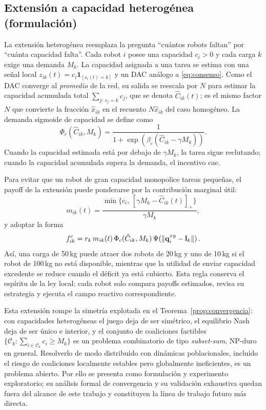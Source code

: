 \subsection{Extensión a capacidad heterogénea (formulación)}
\label{subsec:heterogenea}

La extensión heterogénea reemplaza la pregunta ``cuántos robots faltan'' por ``cuánta
capacidad falta''. Cada robot $i$ posee una capacidad $c_i>0$ y cada carga $k$ exige una
demanda $M_k$. La capacidad asignada a una tarea se estima con una señal local
$z_{ik}(t)=c_i\mathbf{1}_{[s_i(t)=k]}$ y un DAC análogo a \eqref{eq:consenso}. Como el
DAC converge al \emph{promedio} de la red, su salida se reescala por $N$ para estimar la
capacidad acumulada total $\sum_{j:\,s_j=k} c_j$, que se denota $\hat{C}_{ik}(t)$; es el
mismo factor $N$ que convierte la fracción $\hat{x}_{ik}$ en el recuento $N\hat{x}_{ik}$
del caso homogéneo. La demanda sigmoide de capacidad se define como
\begin{equation}
  \Phi_c(\hat{C}_{ik},M_k)=
  \frac{1}{1+\exp\!\left(\beta_c(\hat{C}_{ik}-\gamma M_k)\right)}.
  \label{eq:sigmoid_capacity}
\end{equation}
Cuando la capacidad estimada está por debajo de $\gamma M_k$, la tarea sigue
reclutando; cuando la capacidad acumulada supera la demanda, el incentivo cae.

Para evitar que un robot de gran capacidad monopolice tareas pequeñas, el payoff de la
extensión puede ponderarse por la contribución marginal útil:
\begin{equation}
  m_{ik}(t)=
  \frac{\min\{c_i,\,[\gamma M_k-\hat{C}_{ik}(t)]_+\}}{\gamma M_k},
  \label{eq:marginal_capacity}
\end{equation}
y adoptar la forma
\begin{equation}
  f^c_{ik}=r_k\,m_{ik}(t)\,\Phi_c(\hat{C}_{ik},M_k)\,
  \Psi\!\left(\left\|\mathbf{q}_i^{xy}-\mathbf{l}_k\right\|\right).
  \label{eq:payoff_capacity}
\end{equation}
Así, una carga de 50\,kg puede atraer dos robots de 20\,kg y uno de 10\,kg si el robot de
100\,kg no está disponible, mientras que la utilidad de enviar capacidad excedente se
reduce cuando el déficit ya está cubierto. Esta regla conserva el espíritu de la ley
local: cada robot solo compara payoffs estimados, revisa su estrategia y ejecuta el
campo reactivo correspondiente.

Esta extensión rompe la simetría explotada en el Teorema~\ref{prop:convergencia}: con
capacidades heterogéneas el juego deja de ser simétrico, el equilibrio Nash deja de
ser único e interior, y el conjunto de coaliciones factibles
$\{\mathcal{C}_k : \sum_{i\in\mathcal{C}_k} c_i \geq M_k\}$ es un problema combinatorio
de tipo \emph{subset-sum}, NP-duro en general. Resolverlo de modo distribuido con
dinámicas poblacionales, incluido el riesgo de coaliciones localmente estables pero
globalmente ineficientes, es un problema abierto. Por ello se presenta como formulación
y experimento exploratorio; su análisis formal de convergencia y su validación
exhaustiva quedan fuera del alcance de este trabajo y constituyen la línea de trabajo
futuro más directa.

